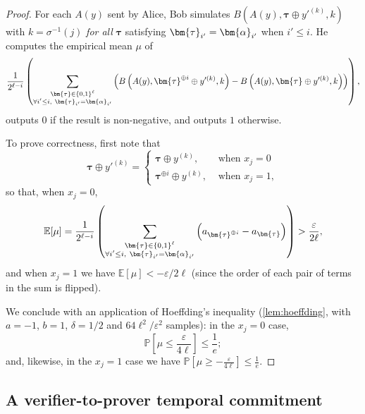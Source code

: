 \documentclass[a4paper,UKenglish,cleveref, autoref, thm-restate]{lipics-v2021}
\theoremstyle{definition}
\newcommand{\E}{\mathbb E}
\renewcommand{\P}{\mathbb P}
\newcommand{\eps}{\varepsilon}
\newcommand{\bitset}{\{0,1\}}
\newcommand{\pcommitstring}{y}
\def\fe#1{
    \ifnum#1=1
        \alpha
    \else
    \ifnum#1=2
        \beta
    \else
    \ifnum#1=3
        \gamma
    \fi\fi\fi
}
\begin{document}
\begin{proof}
    For each $A(\pcommitstring)$ sent by Alice, Bob simulates $B\left(A(\pcommitstring), \bm{\tau} \oplus \pcommitstring'^{(k)}, k\right)$ with $k = \sigma^{-1}(j)$ \emph{for all} $\bm{\tau}$ satisfying  $\bm{\tau}_{i'} = \bm{\fe1}_{i'}$ when $i' \leq i$. He computes the empirical mean $\mu$ of
    \begin{equation*}
        \frac1{2^{\ell - i}}\left(\sum_{\substack{\bm{\tau} \in \bitset^{\ell} \\ \forall i' \leq i, ~ \bm{\tau}_{i'} = \bm{\fe1}_{i'}}} \left(B\left(A(\pcommitstring), \bm{\tau}^{\oplus i} \oplus \pcommitstring'^{(k)}, k\right) - B\left(A(\pcommitstring), \bm{\tau} \oplus \pcommitstring'^{(k)}, k\right)\right)\right),
    \end{equation*}
    outputs $0$ if the result is non-negative, and outputs $1$ otherwise.
    
    To prove correctness, first note that
    \begin{equation*}
        \bm{\tau} \oplus \pcommitstring'^{(k)} = \left\{\begin{array}{ll}\bm{\tau} \oplus \pcommitstring^{(k)}, & \text{ when } x_j = 0\\\bm{\tau}^{\oplus i} \oplus \pcommitstring^{(k)}, & \text{ when } x_j = 1,\end{array}\right.
    \end{equation*}
    so that, when $x_j = 0$,
    \begin{equation*}
        \E[\mu] = \frac1{2^{\ell - i}}\left(\sum_{\substack{\bm{\tau} \in \bitset^{\ell} \\ \forall i' \leq i, ~ \bm{\tau}_{i'} = \bm{\fe1}_{i'}}} \left(a_{\bm{\tau}^{\oplus i}} - a_{\bm{\tau}}\right)\right) > \frac{\eps}{2\ell},
    \end{equation*}
    and when $x_j = 1$ we have $\E[\mu] < -\eps/2\ell$ (since the order of each pair of terms in the sum is flipped).
    
    We conclude with an application of Hoeffding's inequality (\cref{lem:hoeffding}, with $a = -1$, $b = 1$, $\delta = 1/2$ and $64 \ell^2/\eps^2$ samples): in the $x_j = 0$ case,
    \begin{equation*}
        \P\left[\mu \leq \frac{\eps}{4\ell}\right] \leq \frac1 e;
    \end{equation*}
    and, likewise, in the $x_j = 1$ case we have $\P\left[\mu \geq -\frac{\eps}{4\ell}\right] \leq \frac1 e$.
\end{proof}

\subsection{A verifier-to-prover temporal commitment}
\label{sec:vp-commitment}
\end{document}
